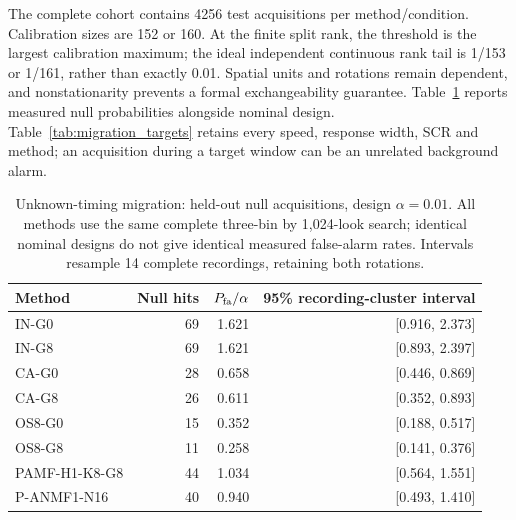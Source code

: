\documentclass[10pt]{article}
\begin{document}
The complete cohort contains 4256 test acquisitions per method/condition. Calibration sizes are 152 or 160. At the finite split rank, the threshold is the largest calibration maximum; the ideal independent continuous rank tail is 1/153 or 1/161, rather than exactly 0.01. Spatial units and rotations remain dependent, and nonstationarity prevents a formal exchangeability guarantee. Table~\ref{tab:migration_null} reports measured null probabilities alongside nominal design. Table~\ref{tab:migration_targets} retains every speed, response width, SCR and method; an acquisition during a target window can be an unrelated background alarm.
\begin{table}[htbp]\centering\small
\caption{Unknown-timing migration: held-out null acquisitions, design $\alpha=0.01$. All methods use the same complete three-bin by 1,024-look search; identical nominal designs do not give identical measured false-alarm rates. Intervals resample 14 complete recordings, retaining both rotations.}\label{tab:migration_null}
\begin{tabular}{lrrr}\toprule
Method & Null hits & $P_{\rm fa}/\alpha$ & 95\% recording-cluster interval\\\midrule
IN-G0 & 69 & 1.621 & [0.916, 2.373]\\
IN-G8 & 69 & 1.621 & [0.893, 2.397]\\
CA-G0 & 28 & 0.658 & [0.446, 0.869]\\
CA-G8 & 26 & 0.611 & [0.352, 0.893]\\
OS8-G0 & 15 & 0.352 & [0.188, 0.517]\\
OS8-G8 & 11 & 0.258 & [0.141, 0.376]\\
PAMF-H1-K8-G8 & 44 & 1.034 & [0.564, 1.551]\\
P-ANMF1-N16 & 40 & 0.940 & [0.493, 1.410]\\
\bottomrule\end{tabular}\end{table}
\end{document}
